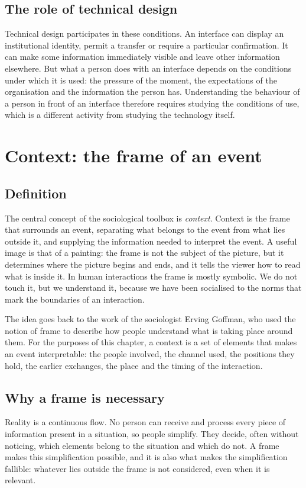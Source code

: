\subsection{The role of technical design}
Technical design participates in these conditions. An interface can display an institutional identity, permit a transfer or require a particular confirmation. It can make some information immediately visible and leave other information elsewhere. But what a person does with an interface depends on the conditions under which it is used: the pressure of the moment, the expectations of the organisation and the information the person has. Understanding the behaviour of a person in front of an interface therefore requires studying the conditions of use, which is a different activity from studying the technology itself.

\section{Context: the frame of an event}

\subsection{Definition}
The central concept of the sociological toolbox is \emph{context}. Context is the frame that surrounds an event, separating what belongs to the event from what lies outside it, and supplying the information needed to interpret the event. A useful image is that of a painting: the frame is not the subject of the picture, but it determines where the picture begins and ends, and it tells the viewer how to read what is inside it. In human interactions the frame is mostly symbolic. We do not touch it, but we understand it, because we have been socialised to the norms that mark the boundaries of an interaction.

The idea goes back to the work of the sociologist Erving Goffman, who used the notion of frame to describe how people understand what is taking place around them. For the purposes of this chapter, a context is a set of elements that makes an event interpretable: the people involved, the channel used, the positions they hold, the earlier exchanges, the place and the timing of the interaction.

\subsection{Why a frame is necessary}
Reality is a continuous flow. No person can receive and process every piece of information present in a situation, so people simplify. They decide, often without noticing, which elements belong to the situation and which do not. A frame makes this simplification possible, and it is also what makes the simplification fallible: whatever lies outside the frame is not considered, even when it is relevant.

